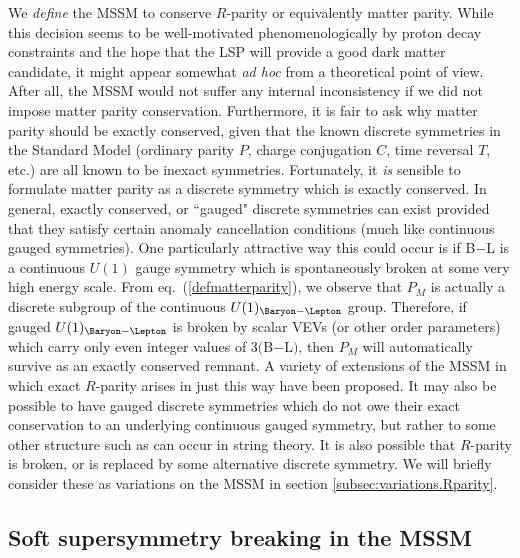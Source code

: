 We {\it define} the MSSM to conserve $R$-parity or equivalently matter
parity.
While this decision seems to be well-motivated phenomenologically
by proton decay constraints and the hope that the LSP will provide
a good dark matter candidate, it might appear somewhat {\it ad hoc} from
a theoretical point of view. After all, the MSSM would not suffer
any internal inconsistency if we did not impose matter parity
conservation. Furthermore, it is fair to ask why matter parity
should be exactly conserved, given that the known discrete symmetries
in the Standard Model (ordinary parity $P$, charge conjugation $C$,
time reversal $T$, etc.) are all known to be inexact symmetries.
Fortunately, it {\it is} sensible to formulate matter parity as a discrete
symmetry which is exactly conserved.
In general, exactly conserved, or ``gauged" discrete symmetries
\cite{KW} can
exist provided that they
satisfy certain
anomaly cancellation conditions \cite{discreteanomaly} (much like
continuous gauged symmetries).
One particularly
attractive way this could occur is if B$-$L is a continuous $U(1)$
gauge symmetry which is spontaneously broken at some very high energy
scale. From eq.~(\ref{defmatterparity}), we observe that $P_M$ is
actually a discrete subgroup of the continuous $U(1)_{\Baryon - \Lepton}$
group.
Therefore, if gauged
$U(1)_{\Baryon - \Lepton}$ is broken by scalar VEVs (or other order
parameters) which carry only even integer values of $3($B$-$L$)$, then
$P_M$ will automatically survive as an exactly conserved
remnant.
A variety of extensions of the MSSM in which exact $R$-parity arises
in just this way have been proposed.\cite{Rparityorigin1,Rparityorigin2}
It may also be possible to have gauged
discrete symmetries which do not owe
their exact conservation to an underlying continuous gauged symmetry,
but rather to some other structure such as can occur in string theory.
It is also possible that $R$-parity is broken, or is
replaced by some alternative
discrete symmetry.
We will briefly consider these as
variations on the MSSM in section
\ref{subsec:variations.Rparity}.

\subsection{Soft supersymmetry breaking in the
MSSM}\label{subsec:mssm.soft}

